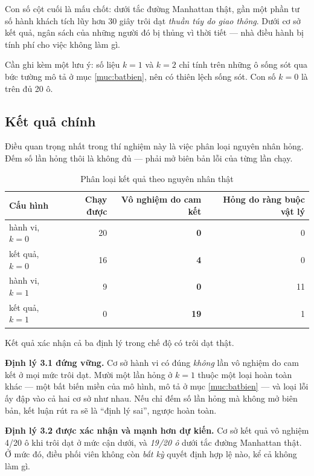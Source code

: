 Con số cột cuối là mấu chốt: dưới tắc đường Manhattan thật, gần một phần tư số hành khách tích
lũy hơn 30 giây trôi dạt \emph{thuần túy do giao thông}. Dưới cơ sở kết quả, ngân sách của những
người đó bị thủng vì thời tiết --- nhà điều hành bị tính phí cho việc không làm gì.

Cần ghi kèm một lưu ý: số liệu $k=1$ và $k=2$ chỉ tính trên những ô sống sót qua bức tường mô tả
ở mục \ref{muc:batbien}, nên có thiên lệch sống sót. Con số $k=0$ là trên đủ 20 ô.

\subsection{Kết quả chính}

Điều quan trọng nhất trong thí nghiệm này là việc phân loại nguyên nhân hỏng. Đếm số lần hỏng
thôi là không đủ --- phải mở biên bản lỗi của từng lần chạy.

\begin{table}[htbp]
\centering
\caption{Phân loại kết quả theo nguyên nhân thật}
\label{bang:phanloai}
\small
\begin{tabular}{@{}lrrr@{}}
\toprule
\textbf{Cấu hình} & \textbf{Chạy được} & \textbf{Vô nghiệm do cam kết} & \textbf{Hỏng do ràng buộc vật lý}\\
\midrule
hành vi, $k=0$ & 20 & \textbf{0} & 0\\
kết quả, $k=0$ & 16 & \textbf{4} & 0\\
hành vi, $k=1$ & 9 & \textbf{0} & 11\\
kết quả, $k=1$ & 0 & \textbf{19} & 1\\
\bottomrule
\end{tabular}
\end{table}

Kết quả xác nhận cả ba định lý trong chế độ có trôi dạt thật.

\textbf{Định lý 3.1 đứng vững.} Cơ sở hành vi có đúng \emph{không} lần vô nghiệm do cam kết ở
mọi mức trôi dạt. Mười một lần hỏng ở $k=1$ thuộc một loại hoàn toàn khác --- một bất biến miền
của mô hình, mô tả ở mục \ref{muc:batbien} --- và loại lỗi ấy đập vào cả hai cơ sở như nhau. Nếu chỉ đếm số
lần hỏng mà không mở biên bản, kết luận rút ra sẽ là ``định lý sai'', ngược hoàn toàn.

\textbf{Định lý 3.2 được xác nhận và mạnh hơn dự kiến.} Cơ sở kết quả vô nghiệm 4/20 ô khi trôi
dạt ở mức cận dưới, và \emph{19/20 ô} dưới tắc đường Manhattan thật. Ở mức đó, điều phối viên
không còn \emph{bất kỳ} quyết định hợp lệ nào, kể cả không làm gì.

